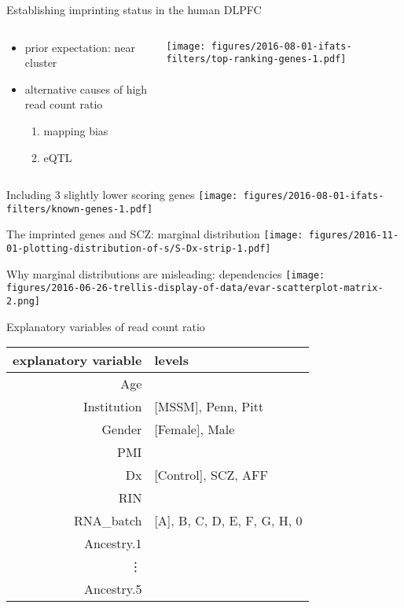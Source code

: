 \documentclass{beamer}
\begin{document}
\begin{frame}{Establishing imprinting status in the human DLPFC}
\begin{columns}[t]
\begin{column}{0.5\textwidth}
\begin{itemize}
\item prior expectation: near cluster
\item alternative causes of high read count ratio
\begin{enumerate}
\item mapping bias
\item eQTL
\end{enumerate}
\end{itemize}
\end{column}
\begin{column}{0.5\textwidth}

\texttt{[image: figures/2016-08-01-ifats-filters/top-ranking-genes-1.pdf]}
\end{column}
\end{columns}
\end{frame}

\begin{frame}{Including 3 slightly lower scoring genes}
\texttt{[image: figures/2016-08-01-ifats-filters/known-genes-1.pdf]}
\end{frame}

\begin{frame}{The imprinted genes and SCZ: marginal distribution}
\texttt{[image: figures/2016-11-01-plotting-distribution-of-s/S-Dx-strip-1.pdf]}
\end{frame}

\begin{frame}{Why marginal distributions are misleading: dependencies}
\texttt{[image: figures/2016-06-26-trellis-display-of-data/evar-scatterplot-matrix-2.png]}
\end{frame}

\begin{frame}{Explanatory variables of read count ratio}
\begin{table}[H]
\begin{center}
\begin{tabular}{r|l}
explanatory variable & levels\\
\hline
Age &  \\
Institution & [MSSM], Penn, Pitt\\
Gender & [Female], Male\\
PMI & \\
Dx & [Control], SCZ, AFF \\
RIN &  \\
RNA\_batch & [A], B, C, D, E, F, G, H, 0\\
Ancestry.1 & \\
\vdots & \\
Ancestry.5 &  \\
\end{tabular}
\end{center}
\end{table}

\end{frame}
\end{document}
